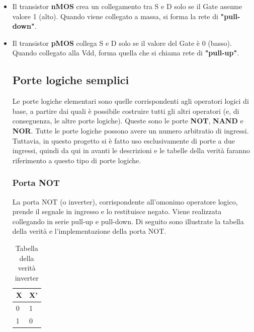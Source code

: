 \documentclass[10pt]{article}
\begin{document}
\begin{itemize}
    \item Il transistor \textbf{nMOS} crea un collegamento tra S e D solo se il Gate assume valore 1 (alto).
    Quando viene collegato a massa, si forma la rete di \textbf{"pull-down"}.
    \item Il transistor \textbf{pMOS} collega S e D solo se il valore del Gate è 0 (basso). Quando collegato alla Vdd,
    forma quella che si chiama rete di \textbf{"pull-up"}.

\subsection{Porte logiche semplici}
Le porte logiche elementari sono quelle corrispondenti agli operatori logici di base, a partire dai quali è possibile costruire tutti gli altri operatori (e, di conseguenza, le altre
porte logiche). Queste sono le porte \textbf{NOT}, \textbf{NAND} e \textbf{NOR}. Tutte le porte logiche possono avere un numero arbitratio di ingressi. 
Tuttavia, in questo progetto si è fatto uso esclusivamente di porte a due ingressi, quindi da qui in avanti le descrizioni e le tabelle della verità faranno riferimento a questo tipo di porte logiche.

\subsubsection{Porta NOT}
La porta NOT (o inverter), corrispondente all'omonimo operatore logico, prende il segnale in ingresso e lo restituisce negato. Viene realizzata collegando in serie pull-up e pull-down. Di seguito 
sono illustrate la tabella della verità e l'implementazione della porta NOT.
\begin{table}[ht]
    \begin{minipage}[b]{0.4\textwidth}
    \centering
    \begin{tabular}{ | l | l |}
        \hline
           X    &    X'   \\ \hline	
           0    &    1    \\ 
           1    &    0    \\ \hline
       \end{tabular}
        \caption{Tabella della verità inverter}
        \label{table:student}
    \end{minipage}
    \end{table}
    
    \begin{figure}[ht]
    \begin{minipage}[b]{0.4\textwidth}
    

\end{minipage}
\end{figure}
\end{itemize}
\end{document}
